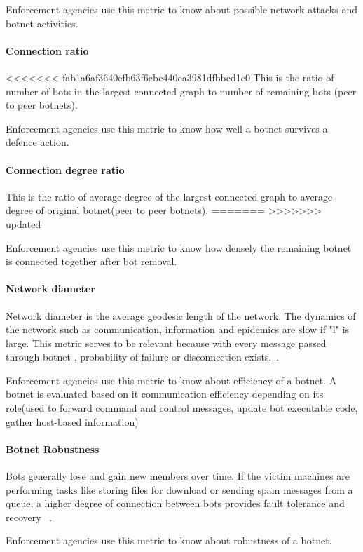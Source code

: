 Enforcement agencies use this metric to know about possible network attacks and botnet activities.

\paragraph{ Connection ratio }

<<<<<<< fab1a6af3640efb63f6ebc440ea3981dfbbcd1e0
This is the ratio of number of bots in the largest connected graph to number of remaining bots (peer to peer botnets).

Enforcement agencies use this metric to know how well a botnet survives a defence action.

\paragraph{ Connection degree ratio }

This is the ratio of average degree of the largest connected graph to average degree of original botnet(peer to peer botnets).
=======
>>>>>>> updated

Enforcement agencies use this metric to know how densely the remaining botnet is connected together after bot removal.

\paragraph{ Network diameter }

Network diameter is the average geodesic length of the network.  The dynamics of the network such as communication, information and epidemics are slow if "l" is large. This metric serves to be relevant  because  with every message passed through botnet , probability of failure or disconnection exists.~\cite{Strayer08botnetdetection}.

Enforcement agencies use this metric to know about efficiency of a botnet. A botnet is evaluated based on it communication efficiency depending on its role(used to forward command and control messages, update bot executable code, gather host-based information)

\paragraph{ Botnet Robustness }

Bots generally lose and gain new members over time. If the victim machines are performing  tasks like storing files for download or sending spam messages from a queue, a higher degree of connection  between bots provides fault tolerance and  recovery ~\cite{Strayer08botnetdetection}.

Enforcement agencies use this metric to know about robustness of a botnet.